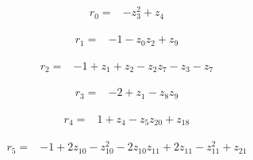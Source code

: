 \par\begingroup\small
\setlength{\abovedisplayskip}{4pt}\setlength{\belowdisplayskip}{5pt}
\par\noindent\begin{minipage}{\linewidth}
\begin{align*}
r_{0}={}&-z_{3}^{2}+z_{4}
\end{align*}
\end{minipage}\par
\par\noindent\begin{minipage}{\linewidth}
\begin{align*}
r_{1}={}&-1-z_{0}z_{2}+z_{9}
\end{align*}
\end{minipage}\par
\par\noindent\begin{minipage}{\linewidth}
\begin{align*}
r_{2}={}&-1+z_{1}+z_{2}-z_{2}z_{7}-z_{3}-z_{7}
\end{align*}
\end{minipage}\par
\par\noindent\begin{minipage}{\linewidth}
\begin{align*}
r_{3}={}&-2+z_{1}-z_{8}z_{9}
\end{align*}
\end{minipage}\par
\par\noindent\begin{minipage}{\linewidth}
\begin{align*}
r_{4}={}&1+z_{4}-z_{5}z_{20}+z_{18}
\end{align*}
\end{minipage}\par
\par\noindent\begin{minipage}{\linewidth}
\begin{align*}
r_{5}={}&-1+2z_{10}-z_{10}^{2}-2z_{10}z_{11}+2z_{11}-z_{11}^{2}+z_{21}
\end{align*}
\end{minipage}\par
